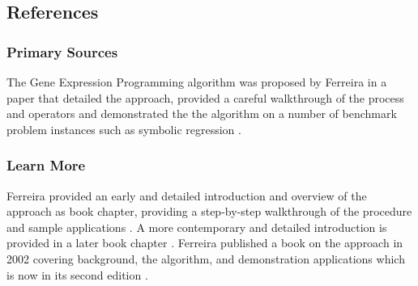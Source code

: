 \subsection{References}

% 
% 
\subsubsection{Primary Sources}
The Gene Expression Programming algorithm was proposed by Ferreira in a paper that detailed the approach, provided a careful walkthrough of the process and operators and demonstrated the the algorithm on a number of benchmark problem instances such as symbolic regression \cite{Ferreira2001}.

% 
% 
\subsubsection{Learn More}
Ferreira provided an early and detailed introduction and overview of the approach as book chapter, providing a step-by-step walkthrough of the procedure and sample applications \cite{Ferreira2002}. A more contemporary and detailed introduction is provided in a later book chapter \cite{Ferreira2005}.
Ferreira published a book on the approach in 2002 covering background, the algorithm, and demonstration applications which is now in its second edition \cite{Ferreira2006}.


